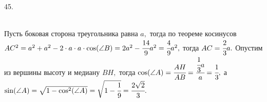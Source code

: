 45. \begin{figure}[ht!]
\end{figure}\\
Пусть боковая сторона треугольника равна $a,$ тогда по теореме косинусов $AC^2=a^2+a^2-2\cdot a\cdot a\cdot \cos(\angle B)=2a^2-\cfrac{14}{9}a^2=\cfrac{4}{9}a^2,$
тогда $AC=\cfrac{2}{3}a.$ Опустим из вершины высоту и медиану $BH,$ тогда $\cos(\angle A)=\cfrac{AH}{AB}=\cfrac{\cfrac{1}{3}a}{a}=\cfrac{1}{3},$
а $\sin(\angle A)=\sqrt{1-\cos^2(\angle A)}=\sqrt{1-\cfrac{1}{9}}=\cfrac{2\sqrt{2}}{3}.$\newpage\noindent
